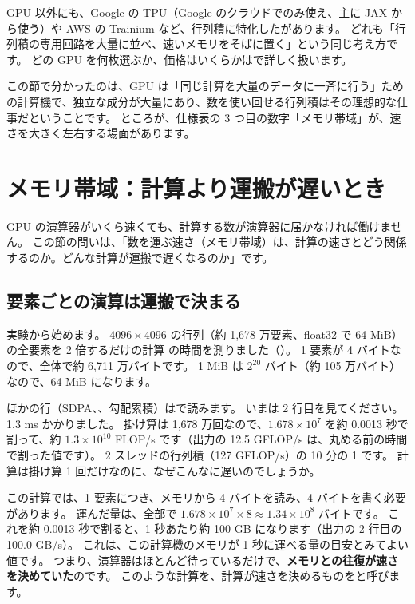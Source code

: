 GPU 以外にも、Google の TPU（Google のクラウドでのみ使え、主に JAX から使う）や AWS の Trainium など、行列積に特化したがあります。
どれも「行列積の専用回路を大量に並べ、速いメモリをそばに置く」という同じ考え方です。
どの GPU を何枚選ぶか、価格はいくらかはで詳しく扱います。

この節で分かったのは、GPU は「同じ計算を大量のデータに一斉に行う」ための計算機で、独立な成分が大量にあり、数を使い回せる行列積はその理想的な仕事だということです。
ところが、仕様表の 3 つ目の数字「メモリ帯域」が、速さを大きく左右する場面があります。

\section{メモリ帯域：計算より運搬が遅いとき}\label{sec:gpu-memory-bw}

GPU の演算器がいくら速くても、計算する数が演算器に届かなければ働けません。
この節の問いは、「数を運ぶ速さ（メモリ帯域）は、計算の速さとどう関係するのか。どんな計算が運搬で遅くなるのか」です。

\subsection*{要素ごとの演算は運搬で決まる}

実験から始めます。
$4096\times4096$ の行列（約 1,678 万要素、float32 で 64 MiB）の全要素を 2 倍するだけの計算  の時間を測りました（）。
1 要素が 4 バイトなので、全体で約 6,711 万バイトです。
1 MiB は $2^{20}$ バイト（約 105 万バイト）なので、64 MiB になります。


ほかの行（SDPA、、勾配累積）はで読みます。
いまは 2 行目を見てください。
1.3 ms かかりました。
掛け算は 1,678 万回なので、$1.678\times10^{7}$ を約 0.0013 秒で割って、約 $1.3\times10^{10}$ FLOP/s です（出力の 12.5 GFLOP/s は、丸める前の時間で割った値です）。
2 スレッドの行列積（127 GFLOP/s）の 10 分の 1 です。
計算は掛け算 1 回だけなのに、なぜこんなに遅いのでしょうか。

この計算では、1 要素につき、メモリから 4 バイトを読み、4 バイトを書く必要があります。
運んだ量は、全部で $1.678\times10^{7}\times8\approx1.34\times10^{8}$ バイトです。
これを約 0.0013 秒で割ると、1 秒あたり約 100 GB になります（出力の 2 行目の 100.0 GB/s）。
これは、この計算機のメモリが 1 秒に運べる量の目安とみてよい値です。
つまり、演算器はほとんど待っているだけで、\textbf{メモリとの往復が速さを決めていた}のです。
このような計算を、計算が速さを決めるものをと呼びます。

